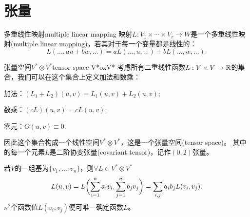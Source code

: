 \section{张量}
\begin{definition}{多重线性映射}{multiple linear mapping}
	映射$L:V_1 \times \cdots \times V_r \to W$是一个多重线性映射(multiple linear mapping)，若其对于每一个变量都是线性的：
	\begin{equation}\label{eq:la-multilinearity}
		L(\ldots,au + bw,\ldots) = aL(\ldots,u,\ldots) + bL(\ldots,w,\ldots).
	\end{equation}
\end{definition}
\begin{definition}{张量空间$V^\ast \otimes V^\ast$}{tensor space V*oxV*}
	考虑所有二重线性函数$L:V \times V \to \mathbb{R}$的集合，我们可以在这个集合上定义加法和数乘：
	\begin{compactitem}
		\item 加法：$(L_1 + L_2)(u,v) = L_1(u,v) + L_2(u,v);$
		\item 数乘：$(cL)(u,v) = cL(u,v);$
		\item 零元：$O(u,v) \equiv 0.$
	\end{compactitem}
	因此这个集合构成一个线性空间$V^\ast \otimes V^\ast$，这是一个张量空间(tensor space)。
	其中的每一个元素$L$是二阶协变张量(covariant tensor)，记作$(0,2)$张量。
\end{definition}
若$V$的一组基为$\{v_1,\ldots,v_n\}$，则$\forall L \in V^\ast \otimes V^\ast$
\[
	L(u,v) = L\biggl(\sum_{i=1}^na_iv_i,\sum_{j=1}^nb_jv_j\biggr) = \sum_{i,j}a_ib_jL(v_i,v_j).
\]
$n^2$个函数值$L(v_i,v_j)$便可唯一确定函数$L$。

